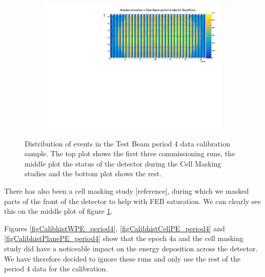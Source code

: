 \documentclass[12pt,a4paper]{article}
\begin{document}
\begin{figure}[!hbtp]
\begin{subfigure}[b]{\textwidth}
\end{subfigure}
\begin{subfigure}[b]{\textwidth}
\centering
\includegraphics[width=.9\textwidth]{Plots/Attenprofs_P4Data_CellPlane_GoodRuns.pdf}
\end{subfigure}
\caption{Distribution of events in the Test Beam period 4 data calibration sample. The top plot shows the first three commissioning runs, the middle plot the status of the detector during the Cell Masking studies and the bottom plot shows the rest.}
\label{figCalibhist_period4}
\end{figure}

There has also been a cell masking study [reference], during which we masked parts of the front of the detector to help with FEB saturation. We can clearly see this on the middle plot of figure \ref{figCalibhist_period4}.

Figures \ref{figCalibhistWPE_period4}, \ref{figCalibhistCellPE_period4} and \ref{figCalibhistPlanePE_period4} show that the epoch 4a and the cell masking study did have a noticeable impact on the energy deposition across the detector. We have therefore decided to ignore these runs and only use the rest of the period 4 data for the calibration.
\end{document}
